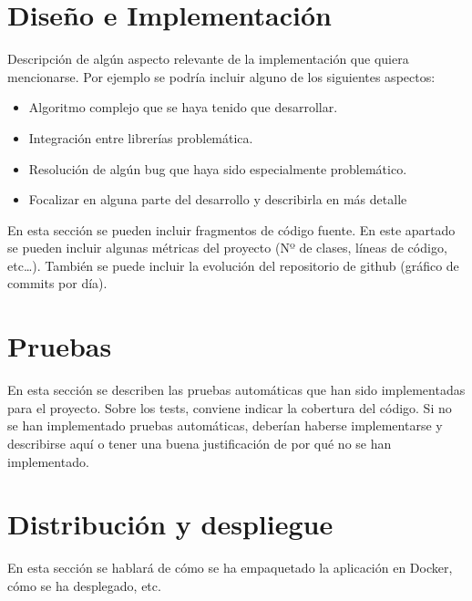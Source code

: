 \section{Diseño e Implementación} 

Descripción de algún aspecto relevante de la implementación que quiera mencionarse. Por ejemplo se podría incluir alguno de los siguientes aspectos:
\begin{itemize}
    \item Algoritmo complejo que se haya tenido que desarrollar.
    \item Integración entre librerías problemática.
    \item Resolución de algún bug que haya sido especialmente problemático.
    \item Focalizar en alguna parte del desarrollo y describirla en más detalle
\end{itemize}

En esta sección se pueden incluir fragmentos de código fuente. En este apartado se pueden incluir algunas métricas del proyecto (Nº de clases, líneas de código, etc…). También se puede incluir la evolución del repositorio de github (gráfico de commits por día).

\section{Pruebas} 

En esta sección se describen las pruebas automáticas que han sido implementadas para el proyecto. Sobre los tests, conviene indicar la cobertura del código. Si no se han implementado pruebas automáticas, deberían haberse implementarse y describirse aquí o tener una buena justificación de por qué no se han implementado.

\section{Distribución y despliegue} 

En esta sección se hablará de cómo se ha empaquetado la aplicación en Docker, cómo se ha desplegado, etc.
